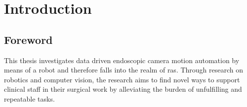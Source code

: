 \chapter[Introduction]{Introduction}
\label{chap:introduction}
\adjustmtc %
\minitoc
\newpage


\section{Foreword}
\label{in:sec:foreword}
This thesis investigates data driven endoscopic camera motion automation by means of a robot and therefore falls into the realm of \gls{ras}. Through research on robotics and computer vision, the research aims to find novel ways to support clinical staff in their surgical work by alleviating the burden of unfulfilling and repeatable tasks.

